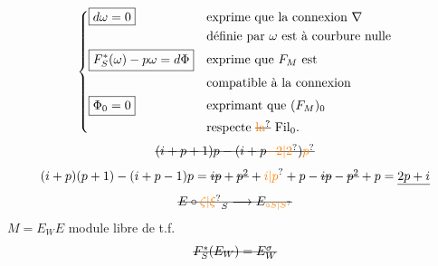\[
\left\{\begin{aligned}
&\boxed{d\omega=0} &&\text{exprime que la connexion $\nabla$}\\
&&&\text{définie par $\omega$ est à courbure nulle}\\
&\boxed{F_S^*(\omega)-p\omega=d\Phi} &&\text{exprime que $F_M$ est}\\
&&&\text{compatible à la connexion}\\
&\boxed{\Phi_0=0} &&\text{exprimant que $(F_M)_0$}\\
&&&\text{respecte \deleted{\unsure{la}} $\mathrm{Fil}_0$.}
\end{aligned}\right.
\]
\[
\deleted{(i+p+1)p-(i+p\unsure{-2|2})\unsure{p}}
\]
\[
(i+p)(p+1)-(i+p-1)p=\deleted{ip}+\deleted{p^2}+\unsure{i|p}+p-\deleted{ip}-\deleted{p^2}+p=\underline{2p+i}
\]
\[
\deleted{E\circ\unsure{\zeta|\xi}_{S}\longrightarrow E_{\unsure{\circ S|S}}}
\]
$M=E_W$\qquad $E$ module libre de t.f.
\[
\deleted{F_S^*(E_W)=E_W^\sigma}
\]
